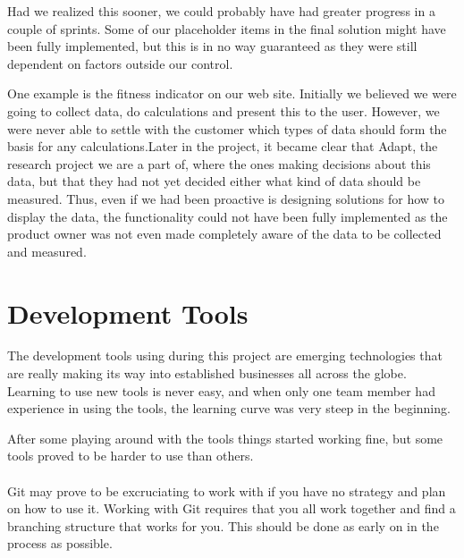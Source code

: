 Had we realized this sooner, we could probably have had greater progress in a couple of sprints. Some of our placeholder items in the final solution might have been fully implemented, but this is in no way guaranteed as they were still dependent on factors outside our control. 

One example is the fitness indicator on our web site. Initially we believed we were going to collect data, do calculations and present this to the user. However, we were never able to settle with the customer which types of data should form the basis for any calculations.Later in the project, it became clear that Adapt, the research project we are a part of, where the ones making decisions about this data, but that they had not yet decided either what kind of data should be measured. Thus, even if we had been proactive is designing solutions for how to display the data, the functionality could not have been fully implemented as the product owner was not even made completely aware of the data to be collected and measured.

\section{Development Tools}

The development tools using during this project are emerging technologies that are really making its way into established businesses all across the globe. Learning to use new tools is never easy, and when only one team member had experience in using the tools, the learning curve was very steep in the beginning.

After some playing around with the tools things started working fine, but some tools proved to be harder to use than others.
\\ \\
Git may prove to be excruciating to work with if you have no strategy and plan on how to use it. Working with Git requires that you all work together and find a branching structure that works for you. This should be done as early on in the process as possible. 
